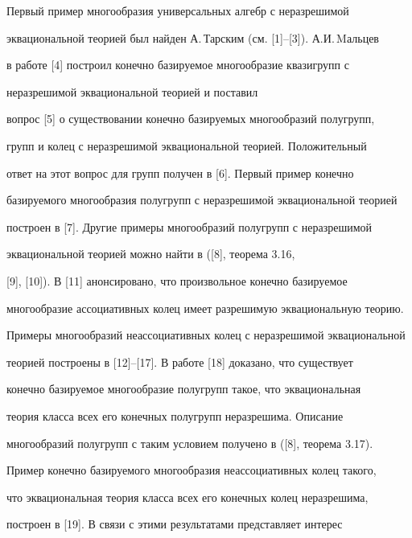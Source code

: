 

\maketitle 


\label{begin} 


 


 


Первый пример многообразия универсальных алгебр с неразрешимой 


эквациональной теорией был найден А.\,Тарским (см. [1]--[3]). А.И.\,Mальцев 


в работе [4] построил конечно базируемое многообразие квазигрупп с 


неразрешимой эквациональной теорией и поставил 


вопрос [5] о существовании конечно базируемых многообразий полугрупп, 


групп и колец с неразрешимой эквациональной теорией. Положительный 


ответ на этот вопрос для групп получен в [6]. Первый пример конечно 


базируемого многообразия полугрупп с неразрешимой эквациональной теорией 


построен в [7]. Другие примеры многообразий полугрупп с неразрешимой 


эквациональной теорией можно найти в ([8], теорема 3.16, 


[9], [10]). В [11] анонсировано, что произвольное конечно базируемое 


многообразие ассоциативных колец имеет разрешимую эквациональную теорию. 


Примеры многообразий неассоциативных колец с неразрешимой эквациональной 


теорией построены в [12]--[17]. В работе [18] доказано, что существует 


конечно базируемое многообразие полугрупп такое, что эквациональная 


теория класса всех его конечных полугрупп неразрешима. Описание 


многообразий полугрупп с таким условием получено в ([8], теорема 3.17). 


Пример конечно базируемого многообразия неассоциативных колец такого, 


что эквациональная теория класса всех его конечных колец неразрешима, 


построен в [19]. В связи с этими результатами представляет интерес 


